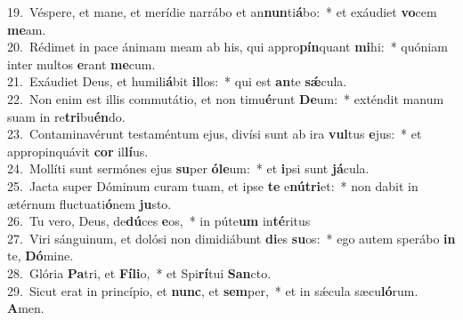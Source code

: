 {19.~}Véspere, et mane, et merídie narrábo et an\textbf{nun}ti\textbf{á}bo:~* et exáudiet \textbf{vo}cem \textbf{me}am.\\
{20.~}Rédimet in pace ánimam meam ab his, qui appro\textbf{pín}quant \textbf{mi}hi:~* quóniam inter multos \textbf{e}rant \textbf{me}cum.\\
{21.~}Exáudiet Deus, et humili\textbf{á}bit \textbf{il}los:~* qui est \textbf{an}te \textbf{sǽ}cula.\\
{22.~}Non enim est illis commutátio, et non timu\textbf{é}runt \textbf{De}um:~* exténdit manum suam in re\textbf{tri}bu\textbf{én}do.\\
{23.~}Contaminavérunt testaméntum ejus, divísi sunt ab ira \textbf{vul}tus \textbf{e}jus:~* et appropinquávit \textbf{cor} il\textbf{lí}us.\\
{24.~}Mollíti sunt sermónes ejus \textbf{su}per \textbf{ó}\textbf{le}um:~* et \textbf{i}psi sunt \textbf{já}cula.\\
{25.~}Jacta super Dóminum curam tuam, et ipse \textbf{te} e\textbf{nú}\textbf{tri}et:~* non dabit in ætérnum fluctuati\textbf{ó}nem \textbf{ju}sto.\\
{26.~}Tu vero, Deus, de\textbf{dú}ces \textbf{e}os,~* in púte\textbf{um} in\textbf{té}ritus\\
{27.~}Viri sánguinum, et dolósi non dimidiábunt \textbf{di}es \textbf{su}os:~* ego autem sperábo \textbf{in} te, \textbf{Dó}mine.\\
{28.~}Glória \textbf{Pa}tri, et \textbf{Fí}\textbf{li}o,~* et Spi\textbf{rí}tui \textbf{San}cto.\\
{29.~}Sicut erat in princípio, et \textbf{nunc}, et \textbf{sem}per,~* et in sǽcula sæcu\textbf{ló}rum. \textbf{A}men.\\
